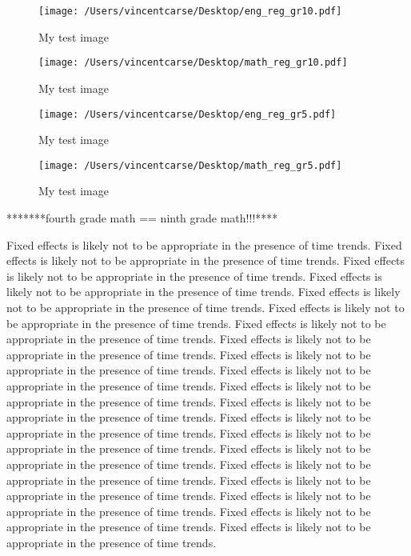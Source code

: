\documentclass[11pt]{article}
\begin{document}
\begin{figure}
    \label{image-myimage}
    \texttt{[image: /Users/vincentcarse/Desktop/eng\_reg\_gr10.pdf]}
    \caption{My test image}
\end{figure}



\begin{figure}
    \label{image-myimage}
    \texttt{[image: /Users/vincentcarse/Desktop/math\_reg\_gr10.pdf]}
    \caption{My test image}
\end{figure}

\begin{figure}
    \label{image-myimage}
    \texttt{[image: /Users/vincentcarse/Desktop/eng\_reg\_gr5.pdf]}
    \caption{My test image}
\end{figure}

\begin{figure}
    \label{image-myimage}
    \texttt{[image: /Users/vincentcarse/Desktop/math\_reg\_gr5.pdf]}
    \caption{My test image}
\end{figure}

*******fourth grade math == ninth grade math!!!****


\FloatBarrier

Fixed effects is likely not to be appropriate in the presence of time trends. 
Fixed effects is likely not to be appropriate in the presence of time trends. 
Fixed effects is likely not to be appropriate in the presence of time trends. 
Fixed effects is likely not to be appropriate in the presence of time trends. 
Fixed effects is likely not to be appropriate in the presence of time trends. 
Fixed effects is likely not to be appropriate in the presence of time trends. 
Fixed effects is likely not to be appropriate in the presence of time trends. 
Fixed effects is likely not to be appropriate in the presence of time trends. 
Fixed effects is likely not to be appropriate in the presence of time trends. 
Fixed effects is likely not to be appropriate in the presence of time trends. 
Fixed effects is likely not to be appropriate in the presence of time trends. 
Fixed effects is likely not to be appropriate in the presence of time trends. 
Fixed effects is likely not to be appropriate in the presence of time trends. 
Fixed effects is likely not to be appropriate in the presence of time trends. 
Fixed effects is likely not to be appropriate in the presence of time trends. 
Fixed effects is likely not to be appropriate in the presence of time trends. 
Fixed effects is likely not to be appropriate in the presence of time trends. 
Fixed effects is likely not to be appropriate in the presence of time trends. 
Fixed effects is likely not to be appropriate in the presence of time trends. 
Fixed effects is likely not to be appropriate in the presence of time trends. 
\end{document}

